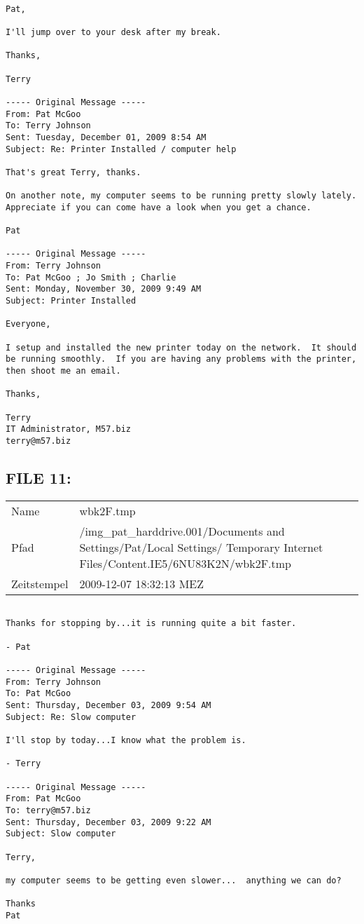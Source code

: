 \begin{lstlisting}

Pat,

I'll jump over to your desk after my break.

Thanks,

Terry

----- Original Message -----
From: Pat McGoo
To: Terry Johnson
Sent: Tuesday, December 01, 2009 8:54 AM
Subject: Re: Printer Installed / computer help

That's great Terry, thanks. 

On another note, my computer seems to be running pretty slowly lately. 
Appreciate if you can come have a look when you get a chance.

Pat

----- Original Message -----
From: Terry Johnson
To: Pat McGoo ; Jo Smith ; Charlie
Sent: Monday, November 30, 2009 9:49 AM
Subject: Printer Installed

Everyone,

I setup and installed the new printer today on the network.  It should
be running smoothly.  If you are having any problems with the printer,
then shoot me an email.

Thanks,

Terry
IT Administrator, M57.biz
terry@m57.biz
\end{lstlisting}

\subsection{FILE 11:}	

\begin{table}[htb]
	\begin{tabular}{p{2cm} p{13.5cm}}
		Name & wbk2F.tmp\\
		Pfad & /img_pat_harddrive.001/Documents and Settings/Pat/Local Settings/ Temporary Internet Files/Content.IE5/6NU83K2N/wbk2F.tmp\\
		Zeitstempel & 2009-12-07 18:32:13 MEZ
	\end{tabular}
\end{table}	

\begin{lstlisting}

Thanks for stopping by...it is running quite a bit faster.

- Pat

----- Original Message -----
From: Terry Johnson
To: Pat McGoo
Sent: Thursday, December 03, 2009 9:54 AM
Subject: Re: Slow computer

I'll stop by today...I know what the problem is.

- Terry

----- Original Message -----
From: Pat McGoo
To: terry@m57.biz
Sent: Thursday, December 03, 2009 9:22 AM
Subject: Slow computer

Terry,

my computer seems to be getting even slower...  anything we can do?

Thanks
Pat
\end{lstlisting}

